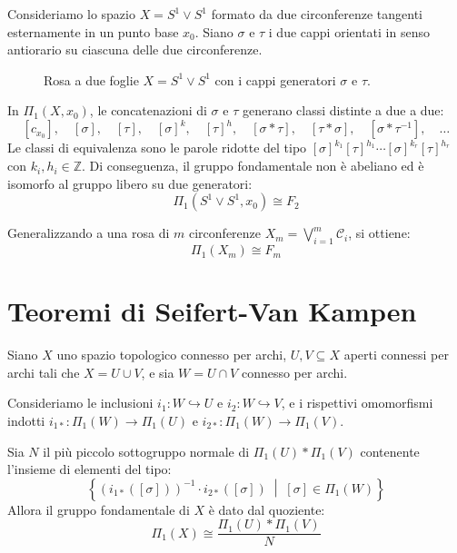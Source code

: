 \begin{ejemplo}
Consideriamo lo spazio $X = S^1 \vee S^1$ formato da due circonferenze tangenti esternamente in un punto base $x_0$.
Siano $\sigma$ e $\tau$ i due cappi orientati in senso antiorario su ciascuna delle due circonferenze.

\begin{figure}[H]
    \centering
    \caption{Rosa a due foglie $X = S^1 \vee S^1$ con i cappi generatori $\sigma$ e $\tau$.}
\end{figure}

In $\Pi_1(X, x_0)$, le concatenazioni di $\sigma$ e $\tau$ generano classi distinte a due a due:
\[
[c_{x_0}], \quad [\sigma], \quad [\tau], \quad [\sigma]^k, \quad [\tau]^h, \quad [\sigma * \tau], \quad [\tau * \sigma], \quad [\sigma * \tau^{-1}], \quad \dots
\]
Le classi di equivalenza sono le parole ridotte del tipo $[\sigma]^{k_1} [\tau]^{h_1} \cdots [\sigma]^{k_r} [\tau]^{h_r}$ con $k_i, h_i \in \mathbb{Z}$.
Di conseguenza, il gruppo fondamentale non è abeliano ed è isomorfo al gruppo libero su due generatori:
\[
\Pi_1(S^1 \vee S^1, x_0) \cong F_2
\]

Generalizzando a una rosa di $m$ circonferenze $X_m = \bigvee_{i=1}^m \mathscr{C}_i$, si ottiene:
\[
\Pi_1(X_m) \cong F_m
\]
\end{ejemplo}

\vspace{1.5em}


\section{Teoremi di Seifert-Van Kampen}

\begin{teo}
Siano $X$ uno spazio topologico connesso per archi, $U, V \subseteq X$ aperti connessi per archi tali che $X = U \cup V$, e sia $W = U \cap V$ connesso per archi.

Consideriamo le inclusioni $i_1: W \hookrightarrow U$ e $i_2: W \hookrightarrow V$, e i rispettivi omomorfismi indotti $i_{1*}: \Pi_1(W) \to \Pi_1(U)$ e $i_{2*}: \Pi_1(W) \to \Pi_1(V)$.

Sia $N$ il più piccolo sottogruppo normale di $\Pi_1(U) * \Pi_1(V)$ contenente l'insieme di elementi del tipo:
\[
\left\{ (i_{1*}([\sigma]))^{-1} \cdot i_{2*}([\sigma]) \;\middle|\; [\sigma] \in \Pi_1(W) \right\}
\]
Allora il gruppo fondamentale di $X$ è dato dal quoziente:
\[
\Pi_1(X) \cong \frac{\Pi_1(U) * \Pi_1(V)}{N}
\]
\end{teo}

